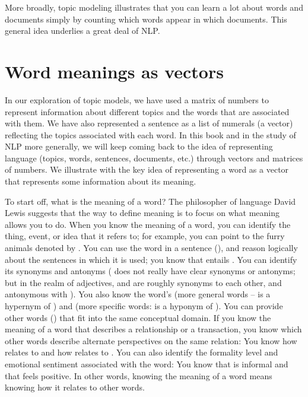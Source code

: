 More broadly, topic modeling illustrates that you can learn a lot
about words and documents simply by counting which words appear in
which documents.  This general idea underlies a great deal of NLP.

\section{Word meanings as vectors}

In our exploration of topic models, we have used a matrix of numbers
to represent information about different topics and the words that are
associated with them.  We have also represented a sentence as a list
of numerals (a vector) reflecting the topics associated with each word.  In this book and in the study of NLP more
generally, we will keep coming back to the idea of representing
language (topics, words, sentences, documents, etc.) through vectors
and matrices of numbers.  We illustrate with the key idea of
representing a word as a vector that represents some information about
its meaning.

To start off, what is the meaning of a word? The
philosopher of language David Lewis \citep{Lewis:1972} suggests that the way to define
meaning is to focus on what meaning allows you to do.  When you know
the meaning of a word, you can identify the thing, event, or idea that
it refers to; for example, you can point to the furry animals denoted
by .  You can use the word in a sentence (), and reason logically about the sentences in which it is used;
you know that  entails .
You can identify its synonyms and antonyms ( does not really have clear synonyms or antonyms; but in the realm of adjectives,
 and  are roughly synonyms to each
other, and antonymous with ).  You also know the
word's  (more general words --  is a
hypernym of ) and  (more specific words:
 is a hyponym of ).  You can provide other
words () that fit into the same
conceptual domain.  If you know the meaning of a word that describes a
relationship or a transaction, you know which other words describe
alternate perspectives on the same relation: You know how
 relates to  and how  relates
to .  You can also identify the formality level and
emotional sentiment associated with the word: You know that
 is informal and that  feels positive.  In
other words, knowing the meaning of a word means knowing how it
relates to other words.


